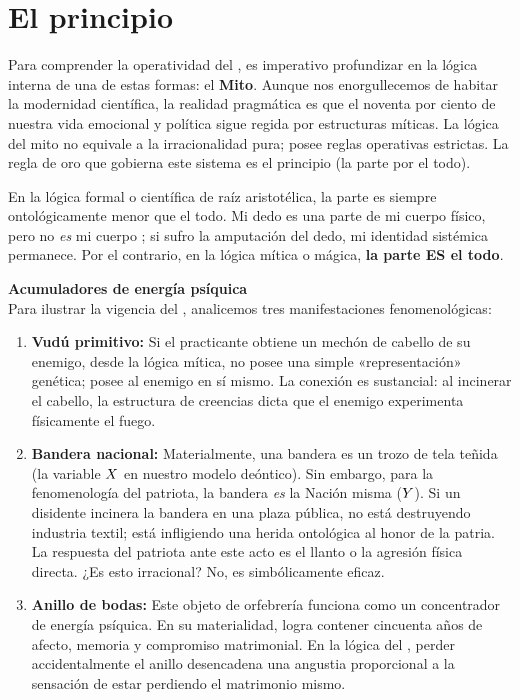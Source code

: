 \section{El principio \ParsProToto}

Para comprender la operatividad del \AnimalSimbolico, es imperativo profundizar en la lógica interna de una de estas formas: el \textbf{Mito}. Aunque nos enorgullecemos de habitar la modernidad científica, la realidad pragmática es que el noventa por ciento de nuestra vida emocional y política sigue regida por estructuras míticas. La lógica del mito no equivale a la irracionalidad pura; posee reglas operativas estrictas. La regla de oro que gobierna este sistema es el principio \textbf{\ParsProToto} (la parte por el todo).

En la lógica formal o científica de raíz aristotélica, la parte es siempre ontológicamente menor que el todo. Mi dedo es una parte de mi cuerpo físico, pero no \textit{es} mi cuerpo ; si sufro la amputación del dedo, mi identidad sistémica permanece. Por el contrario, en la lógica mítica o mágica, \textbf{la parte ES el todo}.

\begin{ejemplo}
\textbf{Acumuladores de energía psíquica}\\
Para ilustrar la vigencia del \ParsProToto, analicemos tres manifestaciones fenomenológicas:
\begin{enumerate}
    \item \textbf{Vudú primitivo:} Si el practicante obtiene un mechón de cabello de su enemigo, desde la lógica mítica, no posee una simple «representación» genética; posee al enemigo en sí mismo. La conexión es sustancial: al incinerar el cabello, la estructura de creencias dicta que el enemigo experimenta físicamente el fuego.
    \item \textbf{Bandera nacional:} Materialmente, una bandera es un trozo de tela teñida (la variable $X$ en nuestro modelo deóntico). Sin embargo, para la fenomenología del patriota, la bandera \textit{es} la Nación misma ($Y$). Si un disidente incinera la bandera en una plaza pública, no está destruyendo industria textil; está infligiendo una herida ontológica al honor de la patria. La respuesta del patriota ante este acto es el llanto o la agresión física directa. ¿Es esto irracional? No, es simbólicamente eficaz.
    \item \textbf{Anillo de bodas:} Este objeto de orfebrería funciona como un concentrador de energía psíquica. En su materialidad, logra contener cincuenta años de afecto, memoria y compromiso matrimonial. En la lógica del \ParsProToto, perder accidentalmente el anillo desencadena una angustia proporcional a la sensación de estar perdiendo el matrimonio mismo.
\end{enumerate}
\end{ejemplo}

